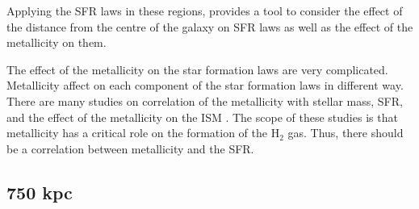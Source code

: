 \documentclass[useAMS,usenatbib]{mn2e}
\newcommand \kpc        {\,{\rm kpc}}
\begin{document}

Applying the SFR laws in these regions, provides a tool to consider the effect of the distance from the centre of the galaxy on SFR laws as well as the effect of the metallicity on them. 
 
The effect of the metallicity on the star formation laws are very complicated.  Metallicity affect on each component of the star formation laws in different way. There are many studies on correlation of the metallicity with stellar mass, SFR, and the effect of the metallicity on the ISM \citep[e.g.,][]{Boissier03, Leroy08, Krumholz09, Mannucci10, Dib11a, Lilly13}. The scope of these studies is that metallicity has a critical role on the formation of the H$_2$ gas. Thus, there should be a correlation between metallicity and the SFR.

\subsection{750 kpc}
\end{document}
